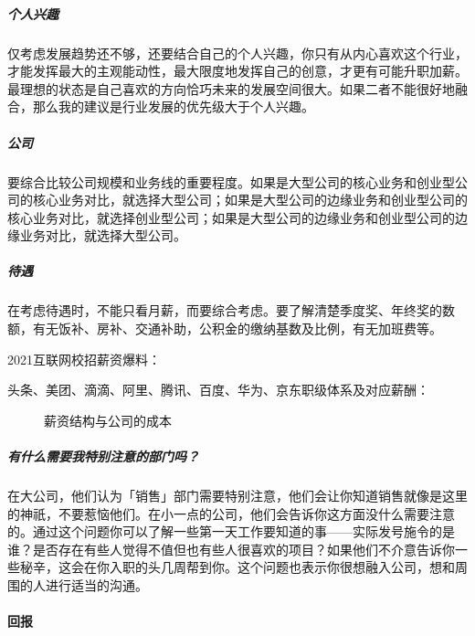 \documentclass[letterpaper,10pt,english]{sphinxmanual}
\begin{document}
\subparagraph{个人兴趣}
\label{\detokenize{chapter_interview/HR:id12}}
仅考虑发展趋势还不够，还要结合自己的个人兴趣，你只有从内心喜欢这个行业，才能发挥最大的主观能动性，最大限度地发挥自己的创意，才更有可能升职加薪。最理想的状态是自己喜欢的方向恰巧未来的发展空间很大。如果二者不能很好地融合，那么我的建议是行业发展的优先级大于个人兴趣。


\subparagraph{公司}
\label{\detokenize{chapter_interview/HR:id13}}
要综合比较公司规模和业务线的重要程度。如果是大型公司的核心业务和创业型公司的核心业务对比，就选择大型公司；如果是大型公司的边缘业务和创业型公司的核心业务对比，就选择创业型公司；如果是大型公司的边缘业务和创业型公司的边缘业务对比，就选择大型公司。


\subparagraph{待遇}
\label{\detokenize{chapter_interview/HR:id14}}
在考虑待遇时，不能只看月薪，而要综合考虑。要了解清楚季度奖、年终奖的数额，有无饭补、房补、交通补助，公积金的缴纳基数及比例，有无加班费等。

2021互联网校招薪资爆料：

头条、美团、滴滴、阿里、腾讯、百度、华为、京东职级体系及对应薪酬：

\begin{figure}[H]
\centering
\capstart

\noindent{}
\caption{薪资结构与公司的成本\sphinxfootnotemark[896]}\label{\detokenize{chapter_interview/HR:id16}}\end{figure}
%
\begin{footnotetext}[896]\sphinxAtStartFootnote
{}
%
\end{footnotetext}\ignorespaces 

\subparagraph{有什么需要我特别注意的部门吗？}
\label{\detokenize{chapter_interview/HR:id15}}
在大公司，他们认为「销售」部门需要特别注意，他们会让你知道销售就像是这里的神祇，不要惹恼他们。在小一点的公司，他们会告诉你这方面没什么需要注意的。通过这个问题你可以了解一些第一天工作要知道的事——实际发号施令的是谁？是否存在有些人觉得不值但也有些人很喜欢的项目？如果他们不介意告诉你一些秘辛，这会在你入职的头几周帮到你。这个问题也表示你很想融入公司，想和周围的人进行适当的沟通。


\paragraph{回报}
\label{\detokenize{chapter_interview/reward:id1}}\label{\detokenize{chapter_interview/reward::doc}}
\end{document}
